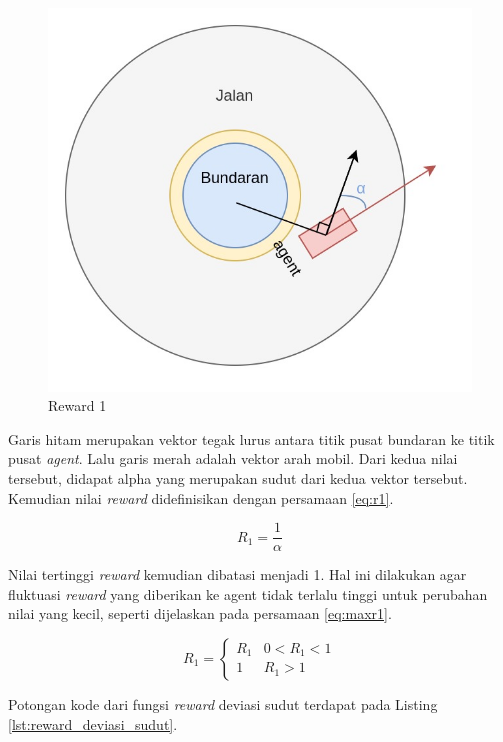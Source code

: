 \begin{figure}[H] 
	\centering
	\includegraphics[width=1\linewidth]{images/reward_anglediff_sketch}
	\caption{Reward 1}
	\label{fig:reward_anglediff_sketch}
\end{figure}

Garis hitam merupakan vektor tegak lurus antara titik pusat bundaran ke titik pusat \textit{agent}. Lalu garis merah adalah vektor arah mobil. Dari kedua nilai tersebut, didapat alpha yang merupakan sudut dari kedua vektor tersebut. Kemudian nilai \textit{reward }didefinisikan dengan persamaan \ref{eq:r1}.

\begin{equation}
	R_1 = \frac{1}{\alpha}
	\label{eq:r1}
\end{equation}

Nilai tertinggi \textit{reward} kemudian dibatasi menjadi 1. Hal ini dilakukan agar fluktuasi \textit{reward }yang diberikan ke agent tidak terlalu tinggi untuk perubahan nilai yang kecil, seperti dijelaskan pada persamaan \ref{eq:maxr1}.


\begin{equation}
	R_1 = \begin{cases}R_1 & 0 < R_1 < 1\\1 & R_1 > 1\end{cases}
	\label{eq:maxr1}
\end{equation}

Potongan kode dari fungsi \textit{reward} deviasi sudut terdapat pada Listing \ref{lst:reward_deviasi_sudut}.

